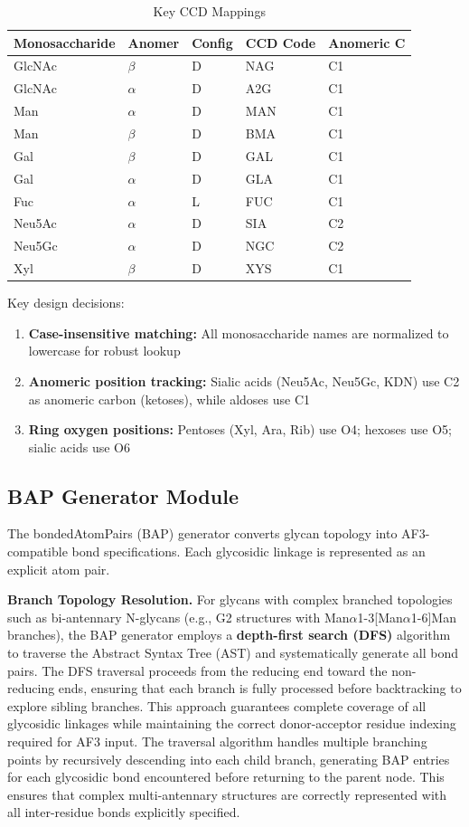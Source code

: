 \begin{table}[h]
\centering
\caption{Key CCD Mappings}
\label{tab:ccd}
\begin{tabular}{lllll}
\toprule
Monosaccharide & Anomer & Config & CCD Code & Anomeric C \\
\midrule
GlcNAc & $\beta$ & D & NAG & C1 \\
GlcNAc & $\alpha$ & D & A2G & C1 \\
Man & $\alpha$ & D & MAN & C1 \\
Man & $\beta$ & D & BMA & C1 \\
Gal & $\beta$ & D & GAL & C1 \\
Gal & $\alpha$ & D & GLA & C1 \\
Fuc & $\alpha$ & L & FUC & C1 \\
Neu5Ac & $\alpha$ & D & SIA & C2 \\
Neu5Gc & $\alpha$ & D & NGC & C2 \\
Xyl & $\beta$ & D & XYS & C1 \\
\bottomrule
\end{tabular}
\end{table}

Key design decisions:
\begin{enumerate}
\item \textbf{Case-insensitive matching:} All monosaccharide names are normalized to lowercase for robust lookup
\item \textbf{Anomeric position tracking:} Sialic acids (Neu5Ac, Neu5Gc, KDN) use C2 as anomeric carbon (ketoses), while aldoses use C1
\item \textbf{Ring oxygen positions:} Pentoses (Xyl, Ara, Rib) use O4; hexoses use O5; sialic acids use O6
\end{enumerate}

\subsection{BAP Generator Module}

The bondedAtomPairs (BAP) generator converts glycan topology into AF3-compatible bond specifications. Each glycosidic linkage is represented as an explicit atom pair.

\textbf{Branch Topology Resolution.} For glycans with complex branched topologies such as bi-antennary N-glycans (e.g., G2 structures with Man$\alpha$1-3[Man$\alpha$1-6]Man branches), the BAP generator employs a \textbf{depth-first search (DFS)} algorithm to traverse the Abstract Syntax Tree (AST) and systematically generate all bond pairs. The DFS traversal proceeds from the reducing end toward the non-reducing ends, ensuring that each branch is fully processed before backtracking to explore sibling branches. This approach guarantees complete coverage of all glycosidic linkages while maintaining the correct donor-acceptor residue indexing required for AF3 input. The traversal algorithm handles multiple branching points by recursively descending into each child branch, generating BAP entries for each glycosidic bond encountered before returning to the parent node. This ensures that complex multi-antennary structures are correctly represented with all inter-residue bonds explicitly specified.

